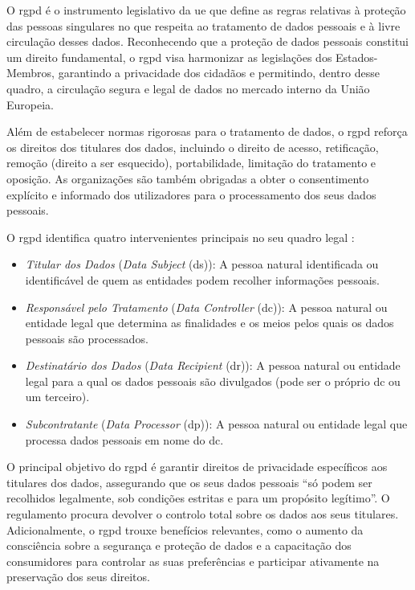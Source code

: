 O \acrshort{rgpd} é o instrumento legislativo da \acrfull{ue} que define as regras relativas à proteção das pessoas singulares no que respeita ao tratamento de dados pessoais e à livre circulação desses dados. Reconhecendo que a proteção de dados pessoais constitui um direito fundamental, o \acrshort{rgpd} visa harmonizar as legislações dos Estados-Membros, garantindo a privacidade dos cidadãos e permitindo, dentro desse quadro, a circulação segura e legal de dados no mercado interno da União Europeia.

Além de estabelecer normas rigorosas para o tratamento de dados, o \acrshort{rgpd} reforça os direitos dos titulares dos dados, incluindo o direito de acesso, retificação, remoção (direito a ser esquecido), portabilidade, limitação do tratamento e oposição. As organizações são também obrigadas a obter o consentimento explícito e informado dos utilizadores para o processamento dos seus dados pessoais. \citep{Daudén-Esmel2024}

O \acrshort{rgpd} identifica quatro intervenientes principais no seu quadro legal \citep{gdpr2016}:  
\begin{itemize}
    \item \textit{Titular dos Dados} (\textit{Data Subject} (\acrshort{ds})): A pessoa natural identificada ou identificável de quem as entidades podem recolher informações pessoais.  
    \item \textit{Responsável pelo Tratamento} (\textit{Data Controller} (\acrshort{dc})): A pessoa natural ou entidade legal que determina as finalidades e os meios pelos quais os dados pessoais são processados.  
    \item \textit{Destinatário dos Dados} (\textit{Data Recipient} (\acrshort{dr})): A pessoa natural ou entidade legal para a qual os dados pessoais são divulgados (pode ser o próprio \acrshort{dc} ou um terceiro).  
    \item \textit{Subcontratante} (\textit{Data Processor} (\acrshort{dp})): A pessoa natural ou entidade legal que processa dados pessoais em nome do \acrshort{dc}.
\end{itemize}

O principal objetivo do \acrshort{rgpd} é garantir direitos de privacidade específicos aos titulares dos dados, assegurando que os seus dados pessoais “só podem ser recolhidos legalmente, sob condições estritas e para um propósito legítimo”. O regulamento procura devolver o controlo total sobre os dados aos seus titulares. Adicionalmente, o \acrshort{rgpd} trouxe benefícios relevantes, como o aumento da consciência sobre a segurança e proteção de dados e a capacitação dos consumidores para controlar as suas preferências e participar ativamente na preservação dos seus direitos.

